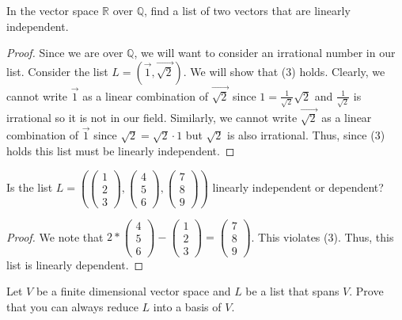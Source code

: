 \begin{exercise}
    In the vector space $\mathbb{R}$ over $\mathbb{Q}$, find a list of two vectors that are linearly independent.
\end{exercise}
\begin{proof}
    Since we are over $\mathbb{Q}$, we will want to consider an irrational number in our list. Consider the list $L=(\vec{1},\vec{\sqrt{2}})$. We will show that (3) holds. Clearly, we cannot write $\vec{1}$ as a linear combination of $\vec{\sqrt{2}}$ since $1=\frac{1}{\sqrt{2}}\sqrt{2}$ and $\frac{1}{\sqrt{2}}$ is irrational so it is not in our field. Similarly, we cannot write $\vec{\sqrt{2}}$ as a linear combination of $\vec{1}$ since $\sqrt{2}=\sqrt{2}\cdot 1$ but $\sqrt{2}$ is also irrational. Thus, since (3) holds this list must be linearly independent.
\end{proof}
\begin{exercise}
    Is the list $L=\left(\begin{pmatrix}
        1 \\ 2 \\ 3
    \end{pmatrix},\begin{pmatrix}
        4 \\ 5 \\ 6
    \end{pmatrix},\begin{pmatrix}
        7 \\ 8 \\ 9
    \end{pmatrix}\right)$ linearly independent or dependent?
\end{exercise}
\begin{proof}
    We note that $2*\begin{pmatrix}
        4 \\ 5 \\ 6
    \end{pmatrix}-\begin{pmatrix}
        1 \\ 2 \\ 3
    \end{pmatrix}=\begin{pmatrix}
        7 \\ 8 \\ 9
    \end{pmatrix}$. This violates (3). Thus, this list is linearly dependent.
\end{proof}
\begin{exercise}
    Let $V$ be a finite dimensional vector space and $L$ be a list that spans $V$. Prove that you can always reduce $L$ into a basis of $V$.
\end{exercise}
